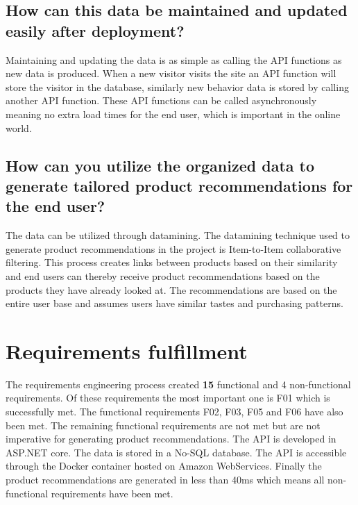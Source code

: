 \subsection{How can this data be maintained and updated easily after deployment?}
Maintaining and updating the data is as simple as calling the API functions as new data is produced. When a new visitor visits the site an API function will store the visitor in the database, similarly new behavior data is stored by calling another API function. These API functions can be called asynchronously meaning no extra load times for the end user, which is important in the online world.

\subsection{How can you utilize the organized data to generate tailored product recommendations for the end user?}
The data can be utilized through datamining. The datamining technique used to generate product recommendations in the project is Item-to-Item collaborative filtering. This process creates links between products based on their similarity and end users can thereby receive product recommendations based on the products they have already looked at. The recommendations are based on the entire user base and assumes users have similar tastes and purchasing patterns.

\section{Requirements fulfillment}
The requirements engineering process created \textbf{15} functional and 4 non-functional requirements. Of these requirements the most important one is F01 which is successfully met. The functional requirements F02, F03, F05 and F06 have also been met. The remaining functional requirements are not met but are not imperative for generating product recommendations. The API is developed in ASP.NET core. The data is stored in a No-SQL database. The API is accessible through the Docker container hosted on Amazon WebServices. Finally the product recommendations are generated in less than 40ms which means all non-functional requirements have been met.
